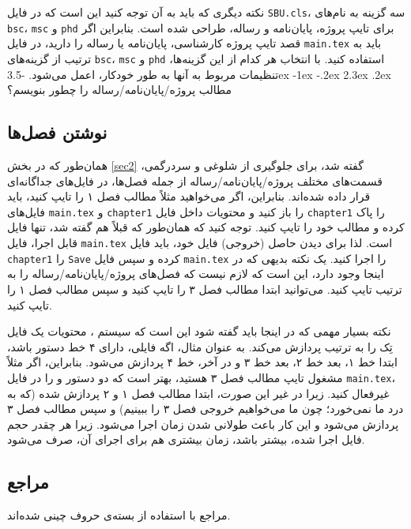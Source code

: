 \documentclass[a4paper,12pt]{article}
\makeatletter
\renewcommand\section{\@startsection {section}{1}{\z@}%
                                   {-3.5ex \@plus -1ex \@minus -.2ex}%
                                   {2.3ex \@plus.2ex}%
                                   {\normalfont\large\bfseries}}
\newcommand{\پ}{پروژه/پایان‌نامه/رساله }
\makeatother
\begin{document}
نکته دیگری که باید به آن توجه کنید این است که در فایل 
\verb!SBU.cls!،
سه گزینه به نام‌های
\verb!bsc!،
\verb!msc!
و
\verb!phd!
برای تایپ پروژه، پایان‌نامه و رساله،
طراحی شده است. بنابراین اگر قصد تایپ پروژه کارشناسی، پایان‌نامه یا رساله را دارید، 
 در فایل 
\verb!main.tex!
باید به ترتیب از گزینه‌های
\verb!bsc!،
\verb!msc!
و
\verb!phd!
استفاده کنید. با انتخاب هر کدام از این گزینه‌ها، تنظیمات مربوط به آنها به طور خودکار، اعمل می‌شود.
\section{مطالب \پ را چطور بنویسم؟}
\subsection{نوشتن فصل‌ها}
همان‌طور که در بخش \ref{sec2} گفته شد، برای جلوگیری از شلوغی و سردرگمی، قسمت‌های مختلف \پ از جمله فصل‌ها، در فایل‌های جداگانه‌ای قرار داده شده‌اند. 
بنابراین، اگر می‌خواهید مثلاً مطالب فصل ۱ را تایپ کنید، باید فایل‌های 
\verb!main.tex!
و
\verb!chapter1!
را باز کنید و محتویات داخل فایل 
\verb!chapter1!
را پاک کرده و مطالب خود را تایپ کنید. توجه کنید که همان‌طور که قبلاً هم گفته شد، تنها فایل قابل اجرا، فایل 
\verb!main.tex!
است. لذا برای دیدن حاصل (خروجی) فایل خود، باید فایل  
\verb!chapter1!
را 
\verb!Save!
کرده و سپس فایل 
\verb!main.tex!
را اجرا کنید. یک نکته بدیهی که در اینجا وجود دارد، این است که لازم نیست که فصل‌های \پ را به ترتیب تایپ کنید. می‌توانید ابتدا مطالب فصل ۳ را تایپ کنید و سپس مطالب فصل ۱ را تایپ کنید. 

نکته بسیار مهمی که در اینجا باید گفته شود این است که سیستم \lr{\TeX}، محتویات یک فایل تِک را به ترتیب پردازش می‌کند. به عنوان مثال، اگه فایلی، دارای ۴ خط دستور باشد، ابتدا خط ۱، بعد خط ۲، بعد خط ۳ و در آخر، خط ۴ پردازش می‌شود. بنابراین، اگر مثلاً مشغول تایپ مطالب فصل ۳ هستید، بهتر است
که دو دستور 
\verb!!
و
\verb!!
را در فایل 
\verb!main.tex!،
غیرفعال%
 کنید. زیرا در غیر این صورت، ابتدا مطالب فصل ۱ و ۲ پردازش شده (که به درد ما نمی‌خورد؛ چون ما می‌خواهیم خروجی فصل ۳ را ببینیم) و سپس مطالب فصل ۳ پردازش می‌شود و این کار باعث طولانی شدن زمان اجرا می‌شود. زیرا هر چقدر حجم فایل اجرا شده، بیشتر باشد، زمان بیشتری هم برای اجرای آن، صرف می‌شود.
\subsection{مراجع}
مراجع با استفاده از بسته‌ی
حروف چینی شده‌اند.
\end{document}
